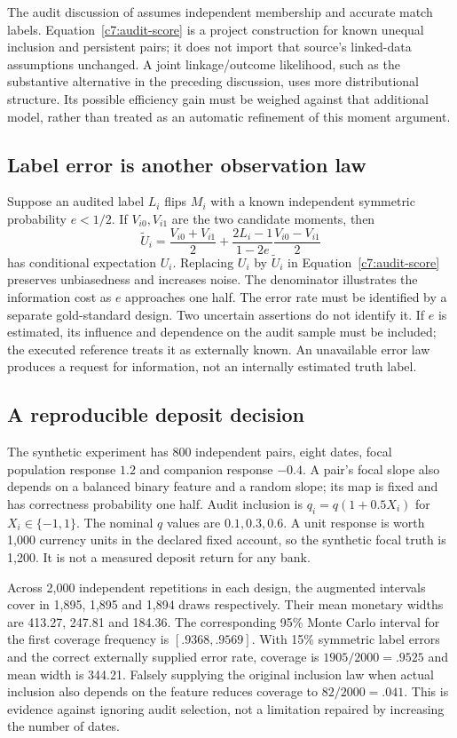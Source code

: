 The audit discussion of \citet[Section 2.1]{slawski2025} assumes independent
membership and accurate match labels. Equation~\eqref{c7:audit-score} is a
project construction for known unequal inclusion and persistent pairs; it
does not import that source's linked-data assumptions unchanged. A joint
linkage/outcome likelihood, such as the substantive alternative in the
preceding discussion, uses more distributional structure. Its possible
efficiency gain must be weighed against that additional model, rather than
treated as an automatic refinement of this moment argument.

\subsection{Label error is another observation law}
Suppose an audited label $L_i$ flips $M_i$ with a known independent symmetric
probability $e<1/2$. If $V_{i0},V_{i1}$ are the two candidate moments, then
\[
 \widetilde U_i=\frac{V_{i0}+V_{i1}}2+
       \frac{2L_i-1}{1-2e}\frac{V_{i0}-V_{i1}}2
\]
has conditional expectation $U_i$. Replacing $U_i$ by $\widetilde U_i$ in
Equation~\eqref{c7:audit-score} preserves unbiasedness and increases noise.
The denominator illustrates the information cost as $e$ approaches one half.
The error rate must be identified by a separate gold-standard design. Two
uncertain assertions do not identify it. If $e$ is estimated, its influence
and dependence on the audit sample must be included; the executed reference
treats it as externally known. An unavailable error law produces a request
for information, not an internally estimated truth label.

\subsection{A reproducible deposit decision}
The synthetic experiment has 800 independent pairs, eight dates, focal
population response $1.2$ and companion response $-0.4$. A pair's focal slope
also depends on a balanced binary feature and a random slope; its map is fixed
and has correctness probability one half. Audit inclusion is
$q_i=q(1+0.5X_i)$ for $X_i\in\{-1,1\}$. The nominal $q$ values are
$0.1,0.3,0.6$. A unit response is worth 1,000 currency units in the declared
fixed account, so the synthetic focal truth is 1,200. It is not a measured
deposit return for any bank.

Across 2,000 independent repetitions in each design, the augmented intervals
cover in 1,895, 1,895 and 1,894 draws respectively. Their mean monetary widths
are 413.27, 247.81 and 184.36. The corresponding 95\% Monte Carlo interval
for the first coverage frequency is $[.9368,.9569]$. With 15\% symmetric
label errors and the correct externally supplied error rate, coverage is
$1905/2000=.9525$ and mean width is 344.21. Falsely supplying the original
inclusion law when actual inclusion also depends on the feature reduces
coverage to $82/2000=.041$. This is evidence against ignoring audit selection,
not a limitation repaired by increasing the number of dates.

